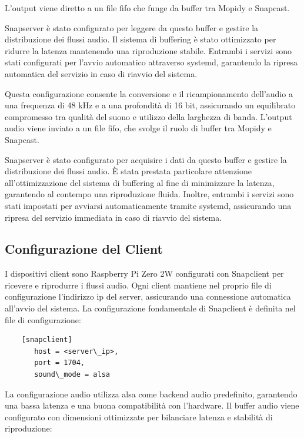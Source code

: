 L'output viene diretto a un file \gls{fifo} che funge da buffer tra Mopidy e Snapcast.

Snapserver è stato configurato per leggere da questo buffer e gestire la distribuzione dei flussi audio. Il sistema di buffering è stato ottimizzato per ridurre la latenza mantenendo una riproduzione stabile. Entrambi i servizi sono stati configurati per l'avvio automatico attraverso systemd, garantendo la ripresa automatica del servizio in caso di riavvio del sistema.

Questa configurazione consente la conversione e il ricampionamento dell'audio a una frequenza di 48 kHz e a una profondità di 16 bit, assicurando un equilibrato compromesso tra qualità del suono e utilizzo della larghezza di banda. L'output audio viene inviato a un file \gls{fifo}, che svolge il ruolo di buffer tra Mopidy e Snapcast.

Snapserver è stato configurato per acquisire i dati da questo buffer e gestire la distribuzione dei flussi audio. È stata prestata particolare attenzione all'ottimizzazione del sistema di buffering al fine di minimizzare la latenza, garantendo al contempo una riproduzione fluida. Inoltre, entrambi i servizi sono stati impostati per avviarsi automaticamente tramite systemd, assicurando una ripresa del servizio immediata in caso di riavvio del sistema.

\subsection{Configurazione del Client}

I dispositivi client sono Raspberry Pi Zero 2W configurati con Snapclient per ricevere e riprodurre i flussi audio. Ogni client mantiene nel proprio file di configurazione l'indirizzo \gls{ip} del server, assicurando una connessione automatica all'avvio del sistema. La configurazione fondamentale di Snapclient è definita nel file di configurazione:

\begin{table}[H]
\begin{algorithm}[H]
  \caption{}
  \BlankLine
  \begin{verbatim}
    [snapclient]
       host = <server\_ip>,
       port = 1704,
       sound\_mode = alsa
  \end{verbatim}
\end{algorithm}
\caption{Configurazione base del client Snapclient}
\end{table}

La configurazione audio utilizza \gls{alsa} come backend audio predefinito, garantendo una bassa latenza e una buona compatibilità con l'hardware. Il buffer audio viene configurato con dimensioni ottimizzate per bilanciare latenza e stabilità di riproduzione:

